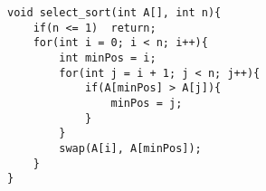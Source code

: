     
\begin{lstlisting}
void select_sort(int A[], int n){
	if(n <= 1)	return;
	for(int i = 0; i < n; i++){
		int minPos = i;
		for(int j = i + 1; j < n; j++){
			if(A[minPos] > A[j]){
				minPos = j;
			}
		}
		swap(A[i], A[minPos]);
	}
}
\end{lstlisting}
